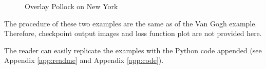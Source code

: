     \begin{figure}[!hbt]
    \center
    \caption{Overlay Pollock on New York}
    \label{fig:results:jp}
    \end{figure}

The procedure of these two examples are the same as of the Van Gogh example.
Therefore, checkpoint output images and loss function plot are not provided here.


The reader can easily replicate the examples with the Python code appended
(see Appendix \ref{app:readme} and Appendix \ref{app:code}).
